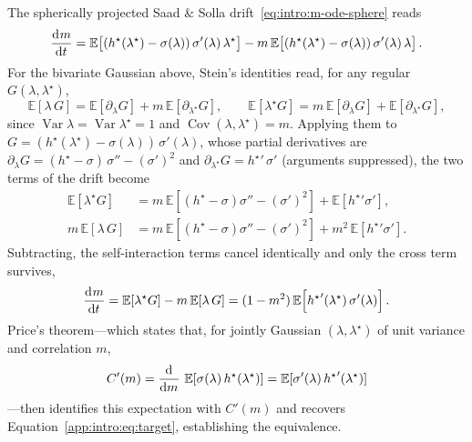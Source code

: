 The spherically projected Saad \& Solla drift~\eqref{eq:intro:m-ode-sphere} reads
\begin{equation}
    \dod{m}{t} = \mathbb{E}\!\left[(h^\star(\lambda^\star) - \sigma(\lambda))\,\sigma'(\lambda)\,\lambda^\star\right] - m\,\mathbb{E}\!\left[(h^\star(\lambda^\star) - \sigma(\lambda))\,\sigma'(\lambda)\,\lambda\right].
\end{equation}
For the bivariate Gaussian above, Stein's identities read, for any regular \(G(\lambda, \lambda^\star)\),
\begin{equation} \label{app:intro:eq:stein}
    \mathbb{E}[\lambda\, G] = \mathbb{E}[\partial_\lambda G] + m\,\mathbb{E}[\partial_{\lambda^\star} G], \qquad
    \mathbb{E}[\lambda^\star G] = m\,\mathbb{E}[\partial_\lambda G] + \mathbb{E}[\partial_{\lambda^\star} G],
\end{equation}
since \(\operatorname{Var}\lambda = \operatorname{Var}\lambda^\star = 1\) and \(\operatorname{Cov}(\lambda, \lambda^\star) = m\). Applying them to \(G = (h^\star(\lambda^\star) - \sigma(\lambda))\,\sigma'(\lambda)\), whose partial derivatives are \(\partial_\lambda G = (h^\star - \sigma)\,\sigma'' - (\sigma')^2\) and \(\partial_{\lambda^\star} G = {h^\star}'\,\sigma'\) (arguments suppressed), the two terms of the drift become
\begin{align}
    \mathbb{E}[\lambda^\star G] &= m\,\mathbb{E}\!\left[(h^\star - \sigma)\sigma'' - (\sigma')^2\right] + \mathbb{E}\!\left[{h^\star}'\sigma'\right], \\
    m\,\mathbb{E}[\lambda\, G] &= m\,\mathbb{E}\!\left[(h^\star - \sigma)\sigma'' - (\sigma')^2\right] + m^2\,\mathbb{E}\!\left[{h^\star}'\sigma'\right].
\end{align}
Subtracting, the self-interaction terms cancel identically and only the cross term survives,
\begin{equation}
    \dod{m}{t} = \mathbb{E}[\lambda^\star G] - m\,\mathbb{E}[\lambda\, G] = (1 - m^2)\,\mathbb{E}\!\left[{h^\star}'(\lambda^\star)\,\sigma'(\lambda)\right].
\end{equation}
Price's theorem---which states that, for jointly Gaussian \((\lambda, \lambda^\star)\) of unit variance and correlation \(m\),
\begin{equation} \label{app:intro:eq:price}
    C'(m) = \dod{}{m}\,\mathbb{E}[\sigma(\lambda)\,h^\star(\lambda^\star)] = \mathbb{E}[\sigma'(\lambda)\,{h^\star}'(\lambda^\star)]
\end{equation}
---then identifies this expectation with \(C'(m)\) and recovers Equation~\eqref{app:intro:eq:target}, establishing the equivalence.

